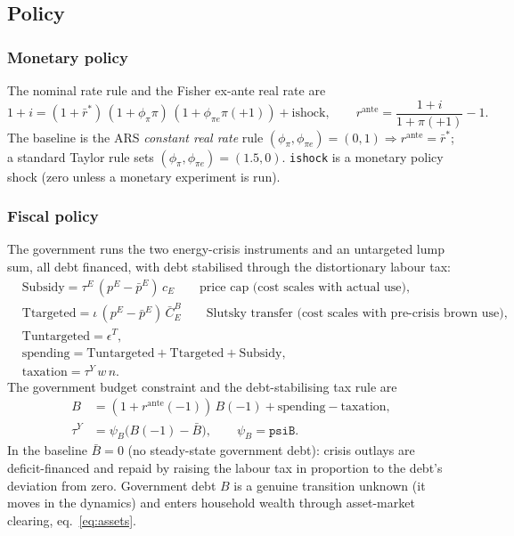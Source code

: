 \documentclass[11pt,a4paper]{article}
\newcommand{\pE}{p^{E}}
\begin{document}
\subsection{Policy}\label{sec:policy}

\subsubsection{Monetary policy}

The nominal rate rule and the Fisher ex-ante real rate are
\begin{equation}
1+i = (1+\bar r^{*})\,(1+\phi_\pi\pi)\,(1+\phi_{\pi e}\pi(+1))+\text{ishock},
\qquad
r^{\text{ante}} = \frac{1+i}{1+\pi(+1)}-1.
\end{equation}
The baseline is the ARS \emph{constant real rate} rule
$(\phi_\pi,\phi_{\pi e})=(0,1)\Rightarrow r^{\text{ante}}=\bar r^{*}$; a standard
Taylor rule sets $(\phi_\pi,\phi_{\pi e})=(1.5,0)$. \texttt{ishock} is a monetary
policy shock (zero unless a monetary experiment is run).

\subsubsection{Fiscal policy}\label{sec:fiscal}

The government runs the two energy-crisis instruments and an untargeted lump sum,
all debt financed, with debt stabilised through the distortionary labour tax:
\begin{align}
&\text{Subsidy} = \tau^{E}\,(\pE-\bar\pE)\,c_E \qquad\text{price cap (cost scales with actual use),}\\
&\text{Ttargeted} = \iota\,(\pE-\bar\pE)\,\bar C^{B}_{E} \qquad\text{Slutsky transfer (cost scales with pre-crisis brown use),}\\
&\text{Tuntargeted} = \epsilon^{T}, \\[2pt]
&\text{spending} = \text{Tuntargeted}+\text{Ttargeted}+\text{Subsidy},\\
&\text{taxation}=\tau^{Y}\,w\,n. 
\end{align}
The government budget constraint and the debt-stabilising tax rule are
\begin{align}
B &= (1+r^{\text{ante}}(-1))\,B(-1)+\text{spending}-\text{taxation},
\label{eq:gbc}\\
\tau^{Y} &= \psi_B\bigl(B(-1)-\bar B\bigr),\qquad \psi_B=\texttt{psiB}.
\label{eq:taurule}
\end{align}
In the baseline $\bar B=0$ (no steady-state government debt): crisis outlays are
deficit-financed and repaid by raising the labour tax in proportion to the debt's
deviation from zero. Government debt $B$ is a genuine transition unknown (it moves
in the dynamics) and enters household wealth through asset-market clearing,
eq.~\eqref{eq:assets}.
\end{document}
